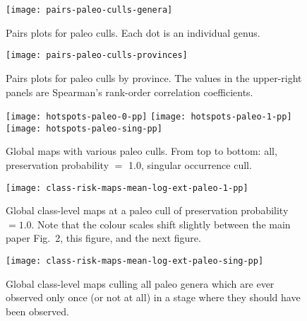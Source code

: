 \documentclass[11pt]{article}
\begin{document}
\begin{figure}[htbp]
\begin{center}
\texttt{[image: pairs-paleo-culls-genera]}
\caption{Pairs plots for paleo culls. Each dot is an individual genus.}
\label{fig:pairs-genus-paleo-culls}
\end{center}
\end{figure}

\clearpage

\begin{figure}[htbp]
\begin{center}
\texttt{[image: pairs-paleo-culls-provinces]}
\caption{Pairs plots for paleo culls by province. The values in the upper-right panels are Spearman's rank-order correlation coefficients.}
\label{fig:pairs-prov-paleo-culls}
\end{center}
\end{figure}

\clearpage

\begin{figure}[htbp]
\begin{center}
\texttt{[image: hotspots-paleo-0-pp]}
\texttt{[image: hotspots-paleo-1-pp]}
\texttt{[image: hotspots-paleo-sing-pp]}
\caption{Global maps with various paleo culls. From top to bottom: all, preservation probability $=$ 1.0, singular occurrence cull.}
\label{fig:overall-maps-paleo-culls}
\end{center}
\end{figure}

\begin{figure}[htbp]
\begin{center}
\texttt{[image: class-risk-maps-mean-log-ext-paleo-1-pp]}
\caption{Global class-level maps at a paleo cull of preservation probability $= 1.0$. Note that the colour scales shift slightly between the main paper Fig.\ 2, this figure, and the next figure.}
\label{fig:class-maps-paleo-cull-1-pp}
\end{center}
\end{figure}

\begin{figure}[htbp]
\begin{center}
\texttt{[image: class-risk-maps-mean-log-ext-paleo-sing-pp]}
\caption{Global class-level maps culling all paleo genera which are ever observed only once (or not at all) in a stage where they should have been observed.}
\label{fig:class-maps-paleo-sing-pp}
\end{center}
\end{figure}
\end{document}
